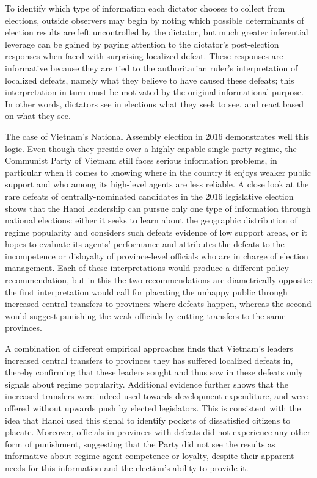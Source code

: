 \documentclass[12pt]{article}
\newcommand{\1}{\mathbbm{1}}
\begin{document}
To identify which type of information each dictator chooses to collect from elections, outside observers may begin by noting which possible determinants of election results are left uncontrolled by the dictator, but much greater inferential leverage can be gained by paying attention to the dictator's post-election responses when faced with surprising localized defeat. These responses are informative because they are tied to the authoritarian ruler's interpretation of localized defeats, namely what they believe to have caused these defeats; this interpretation in turn must be motivated by the original informational purpose. In other words, dictators see in elections what they seek to see, and react based on what they see.

The case of Vietnam's National Assembly election in 2016 demonstrates well this logic. Even though they preside over a highly capable single-party regime, the Communist Party of Vietnam still faces serious information problems, in particular when it comes to knowing where in the country it enjoys weaker public support and who among its high-level agents are less reliable. A close look at the rare defeats of centrally-nominated candidates in the 2016 legislative election shows that the Hanoi leadership can pursue only one type of information through national elections: either it seeks to learn about the geographic distribution of regime popularity and considers such defeats evidence of low support areas, or it hopes to evaluate its agents' performance and attributes the defeats to the incompetence or disloyalty of province-level officials who are in charge of election management. Each of these interpretations would produce a different policy recommendation, but in this the two recommendations are diametrically opposite: the first interpretation would call for placating the unhappy public through increased central transfers to provinces where defeats happen, whereas the second would suggest punishing the weak officials by cutting transfers to the same provinces.

A combination of different empirical approaches finds that Vietnam's leaders increased central transfers to provinces they has suffered localized defeats in, thereby confirming that these leaders sought and thus saw in these defeats only signals about regime popularity. Additional evidence further shows that the increased transfers were indeed used towards development expenditure, and were offered without upwards push by elected legislators. This is consistent with the idea that Hanoi used this signal to identify pockets of dissatisfied citizens to placate. Moreover, officials in provinces with defeats did not experience any other form of punishment, suggesting that the Party did not see the results as informative about regime agent competence or loyalty, despite their apparent needs for this information and the election's ability to provide it. 
\end{document}
